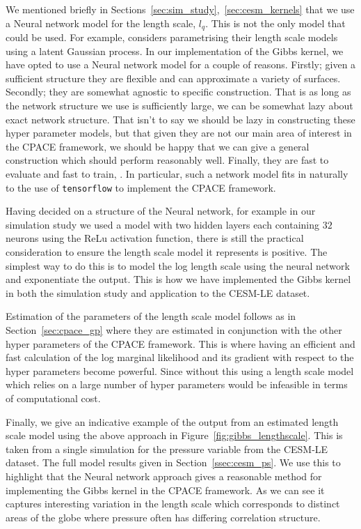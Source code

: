 We mentioned briefly in Sections~\ref{sec:sim_study},~\ref{sec:cesm_kernels} that we use a Neural network model for the length scale, $l_q$.
This is not the only model that could be used.
For example, \citep{paciorek_spatial_2006} considers parametrising their length scale models using a latent Gaussian process.
In our implementation of the Gibbs kernel, we have opted to use a Neural network model for a couple of reasons.
Firstly; given a sufficient structure they are flexible and can approximate a variety of surfaces.
Secondly; they are somewhat agnostic to specific construction.
That is as long as the network structure we use is sufficiently large, we can be somewhat lazy about exact network structure. 
That isn't to say we should be lazy in constructing these hyper parameter models, but that given they are not our main area of interest in the CPACE framework, we should be happy that we can give a general construction which should perform reasonably well.
Finally, they are fast to evaluate and fast to train, \citep{abadi_tensorflow_2016}.
In particular, such a network model fits in naturally to the use of \verb*|tensorflow| to implement the CPACE framework.

Having decided on a structure of the Neural network, for example in our simulation study we used a model with two hidden layers each containing $32$ neurons using the ReLu activation function, there is still the practical consideration to ensure the length scale model it represents is positive.
The simplest way to do this is to model the log length scale using the neural network and exponentiate the output.
This is how we have implemented the Gibbs kernel in both the simulation study and application to the CESM-LE dataset. 

Estimation of the parameters of the length scale model follows as in Section~\ref{sec:cpace_gp} where they are estimated in conjunction with the other hyper parameters of the CPACE framework.
This is where having an efficient and fast calculation of the log marginal likelihood and its gradient with respect to the hyper parameters become powerful.
Since without this using a length scale model which relies on a large number of hyper parameters would be infeasible in terms of computational cost.

Finally, we give an indicative example of the output from an estimated length scale model using the above approach in Figure~\ref{fig:gibbs_lengthscale}.
This is taken from a single simulation for the pressure variable from the CESM-LE dataset.
The full model results given in Section~\ref{ssec:cesm_ps}.
We use this to highlight that the Neural network approach gives a reasonable method for implementing the Gibbs kernel in the CPACE framework.
As we can see it captures interesting variation in the length scale which corresponds to distinct areas of the globe where pressure often has differing correlation structure.


